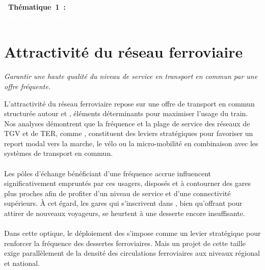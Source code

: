 \documentclass[../main.tex]{subfiles}
\begin{document}
    \newpage

    \vspace{15pt}
    \noindent
    \Large
\textbf{\textcolor{UGEblue}{~Thématique~1~:}}
    \\
\colorbox{UGEblue}{\textbf{\textcolor{white}{~Faciliter les connexions intermodales~}}}
    \vspace{15pt}

    \vspace{15pt}
\section{Attractivité du réseau ferroviaire}

\begin{block}[Améliorer]
    \linespread{0.9}\selectfont %
    \textit{\small{Garantir une haute qualité du niveau de service en transport en commun par une offre fréquente.}}
\end{block}

    \begin{multicols}{2}
    \raggedcolumns
    \small{
L’attractivité du réseau ferroviaire repose sur une offre de transport en commun structurée autour  et , éléments déterminants pour maximiser l’usage du train. Nos analyses démontrent que la fréquence et la plage de service des réseaux de TGV et de TER,  comme , constituent des leviers stratégiques pour favoriser un report modal vers la marche, le vélo ou la micro-mobilité en combinaison avec les systèmes de transport en commun.
    \\\\
Les pôles d’échange bénéficiant d’une fréquence accrue influencent significativement  empruntés par ces usagers, disposés  et à contourner des gares plus proches afin de profiter d’un niveau de service et d'une connectivité supérieurs. À cet égard, les gares qui s'inscrivent dans , bien qu’offrant  pour attirer de nouveaux voyageurs, se heurtent à une desserte encore insuffisante.
    \\\\
Dans cette optique, le déploiement des  s’impose comme un levier stratégique pour renforcer la fréquence des dessertes ferroviaires. Mais un projet de cette taille exige parallèlement  de la densité des circulations ferroviaires aux niveaux régional et national.
    }
    \end{multicols}
\end{document}
